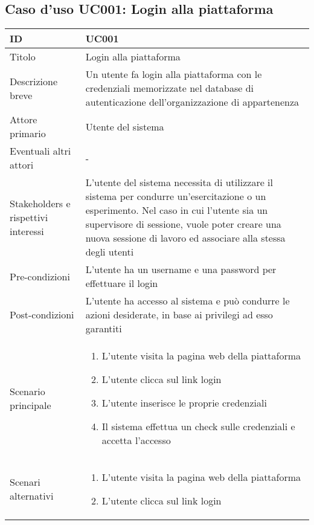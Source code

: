 \documentclass[../../main.tex]{subfiles}
\begin{document}
\subsection{Caso d’uso UC001: Login alla piattaforma}
\begin{tabularx}{\textwidth}{|l|X|}
    \hline
    ID                                  & \textbf{UC001}\\
    \hline
    Titolo                              & Login alla piattaforma \\
    \hline
    Descrizione breve                   & Un utente fa login alla piattaforma con le credenziali memorizzate nel database di autenticazione dell'organizzazione di appartenenza   \\
    \hline
    Attore primario                     & Utente del sistema \\
    \hline
    Eventuali altri attori              & -   \\
    \hline
    Stakeholders e rispettivi interessi & L'utente del sistema necessita di utilizzare il sistema per condurre un'esercitazione o un esperimento. Nel caso in cui l'utente sia un supervisore di sessione, vuole poter creare una nuova sessione di lavoro ed associare alla stessa degli utenti   \\
    \hline
    Pre-condizioni                      & L'utente ha un username e una password per effettuare il login   \\
    \hline
    Post-condizioni                     & L'utente ha accesso al sistema e può condurre le azioni desiderate, in base ai privilegi ad esso garantiti   \\
    \hline
    Scenario principale                 & \parbox[t][2.5cm]{8cm}{\begin{enumerate}
\item L'utente visita la pagina web della piattaforma
\item L'utente clicca sul link login
\item L'utente inserisce le proprie credenziali
\item Il sistema effettua un check sulle credenziali e accetta l'accesso
    \end{enumerate}}
    \\
    \hline
    Scenari alternativi                 &
    \parbox[t][4cm]{8cm}{
    \begin{enumerate}
\item L'utente visita la pagina web della piattaforma
\item L'utente clicca sul link login

\end{enumerate}}
\end{tabularx}
\end{document}
